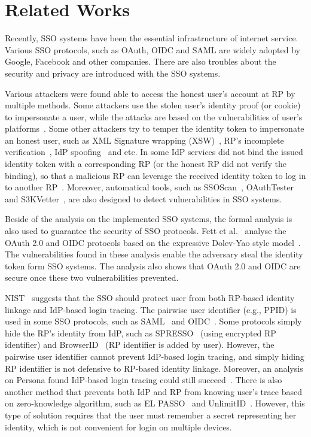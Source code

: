 \section{Related Works}
Recently, SSO systems have been the essential infrastructure of internet service. Various SSO protocols, such as OAuth, OIDC and SAML are  widely adopted by Google, Facebook and other companies. There are also troubles about the security and privacy are introduced with the SSO systems. 

Various attackers were found able to access the honest user's account at RP by multiple methods. 
Some attackers use the stolen user's identity proof (or cookie) to impersonate a user, while the attacks are based on the vulnerabilities of user's platforms~\cite{WangCW12,ArmandoCCCPS13}.
Some other attackers try to temper the identity token to impersonate an honest user, such as  XML Signature wrapping (XSW)~\cite{SomorovskyMSKJ12}, RP's incomplete verification~\cite{WangCW12,WangZLG16,MainkaMSW17}, IdP spoofing~\cite{MainkaMS16,MainkaMSW17} and etc. 
In some IdP services did not bind the issued identity token with a corresponding RP (or the honest RP did not verify the binding), so that a malicious RP can leverage the received identity token to log in to another RP~\cite{YangLCZ18,WangZLG16,MainkaMS16,MainkaMSW17,YangLCZ18}. 
Moreover, automatical tools, such as SSOScan~\cite{ZhouE14}, OAuthTester~\cite{YangLLZH16} and S3KVetter~\cite{YangLCZ18}, are also designed to detect vulnerabilities in SSO systems.

Beside of the analysis on the implemented SSO systems, the formal analysis is also used to guarantee the security of SSO protocols. Fett et al.~\cite{FettKS16, FettKS17} analyse the OAuth 2.0 and OIDC protocols based on the expressive Dolev-Yao style model~\cite{FettKS14}. The vulnerabilities found in these analysis enable the adversary steal the identity token form SSO systems. The analysis also shows that OAuth 2.0 and OIDC are secure once these two vulnerabilities prevented. 

NIST~\cite{NIST2017draft} suggests that the SSO should protect user from both RP-based identity linkage and IdP-based login tracing. The pairwise user identifier (e.g., PPID) is used in some SSO protocols, such as SAML~\cite{SAML} and OIDC~\cite{OpenIDConnect}. Some protocols simply hide the RP's identity from IdP, such as SPRESSO~\cite{SPRESSO} (using encrypted RP identifier) and BrowserID~\cite{BrowserID} (RP identifier is added by user). However, the pairwise user identifier cannot prevent IdP-based login tracing, and simply hiding RP identifier is not defensive to RP-based identity linkage. Moreover, an analysis on Persona found IdP-based login tracing could still succeed~\cite{FettKS14, BrowserID}.
There is also another method that prevents both IdP and RP from knowing user's trace based on zero-knowledge algorithm, such as EL PASSO~\cite{ZhangKSZR21} and UnlimitID~\cite{IsaakidisHD16}. However, this type of solution requires that the user must remember a secret representing her identity, which is not convenient for login on multiple devices.

